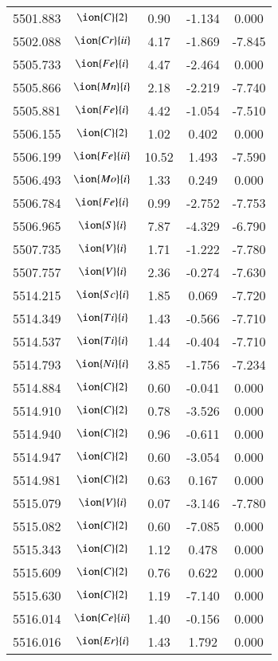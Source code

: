 \documentclass[fleqn,usenatbib]{mnras}
\begin{document}
\begin{center}
\begin{table}
\begin{tabular}{ccccc}
5501.883 &  $\ion{C}{2}$ & 0.90 & -1.134 & 0.000 \\ 
5502.088 &  $\ion{Cr}{ii}$  & 4.17 & -1.869 & -7.845 \\ 
5505.733 &  $\ion{Fe}{i}$  & 4.47 & -2.464 & 0.000 \\ 
5505.866 &  $\ion{Mn}{i}$  & 2.18 & -2.219 & -7.740 \\ 
5505.881 &  $\ion{Fe}{i}$  & 4.42 & -1.054 & -7.510 \\ 
5506.155 &  $\ion{C}{2}$ & 1.02 & 0.402 & 0.000 \\ 
5506.199 &  $\ion{Fe}{ii}$  & 10.52 & 1.493 & -7.590 \\ 
5506.493 &  $\ion{Mo}{i}$  & 1.33 & 0.249 & 0.000 \\ 
5506.784 &  $\ion{Fe}{i}$  & 0.99 & -2.752 & -7.753 \\ 
5506.965 &  $\ion{S}{i}$  & 7.87 & -4.329 & -6.790 \\ 
5507.735 &  $\ion{V}{i}$  & 1.71 & -1.222 & -7.780 \\ 
5507.757 &  $\ion{V}{i}$  & 2.36 & -0.274 & -7.630 \\ 
5514.215 &  $\ion{Sc}{i}$  & 1.85 & 0.069 & -7.720 \\ 
5514.349 &  $\ion{Ti}{i}$  & 1.43 & -0.566 & -7.710 \\ 
5514.537 &  $\ion{Ti}{i}$  & 1.44 & -0.404 & -7.710 \\ 
5514.793 &  $\ion{Ni}{i}$  & 3.85 & -1.756 & -7.234 \\ 
5514.884 &  $\ion{C}{2}$ & 0.60 & -0.041 & 0.000 \\ 
5514.910 &  $\ion{C}{2}$ & 0.78 & -3.526 & 0.000 \\ 
5514.940 &  $\ion{C}{2}$ & 0.96 & -0.611 & 0.000 \\ 
5514.947 &  $\ion{C}{2}$ & 0.60 & -3.054 & 0.000 \\ 
5514.981 &  $\ion{C}{2}$ & 0.63 & 0.167 & 0.000 \\ 
5515.079 &  $\ion{V}{i}$  & 0.07 & -3.146 & -7.780 \\ 
5515.082 &  $\ion{C}{2}$ & 0.60 & -7.085 & 0.000 \\ 
5515.343 &  $\ion{C}{2}$ & 1.12 & 0.478 & 0.000 \\ 
5515.609 &  $\ion{C}{2}$ & 0.76 & 0.622 & 0.000 \\ 
5515.630 &  $\ion{C}{2}$ & 1.19 & -7.140 & 0.000 \\ 
5516.014 &  $\ion{Ce}{ii}$  & 1.40 & -0.156 & 0.000 \\ 
5516.016 &  $\ion{Er}{i}$  & 1.43 & 1.792 & 0.000 \\ 

\end{tabular}
\end{table}
\end{center}
\end{document}
